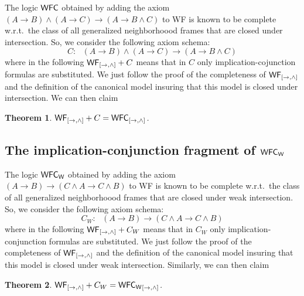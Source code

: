 \documentclass[12pt]{article}
\newtheorem{thm}{Theorem}[section]
\newtheorem{lem}[thm]{Lemma}
\begin{document}
The logic ${\sf WFC} $ obtained by adding the axiom $(A \rightarrow  B)\wedge (  A\rightarrow C ) \rightarrow (A\rightarrow B\wedge C) $ to {\sf WF} is known to be complete w.r.t.\ the class of all generalized neighborhoood frames that are closed under intersection. 
So, we consider the following axiom schema:
$$  C:~~ ~(A \rightarrow  B)\wedge (  A\rightarrow C ) \rightarrow (A\rightarrow B\wedge C) $$
where in the following ${\sf WF}_{[\rightarrow, \wedge]}+ C$ means that in $  C$ only implication-cojunction formulas are substituted.
We just follow the proof of the completeness of $ {\sf WF_{[\rightarrow, \wedge]}} $ and the definition of the canonical model insuring that this model is closed under intersection. We can then claim

\begin{thm}
${\sf WF}_{[\rightarrow, \wedge]}+ C={\sf WFC}_{[\rightarrow, \wedge]}$.
\end{thm}

\subsection{The implication-conjunction fragment of $ {\sf WFC_{W}}$}
The logic ${\sf WFC_{W}} $ obtained by adding the axiom $(A \rightarrow  B)\rightarrow (C\wedge A\rightarrow C\wedge B)   $ to {\sf WF} is known to be complete w.r.t.\ the class of all generalized neighborhoood frames that are closed under weak intersection. 
So, we consider the following axiom schema:
$$  C_{W}:~~ ~(A \rightarrow  B)\rightarrow (C\wedge A\rightarrow C\wedge B)  $$
where in the following ${\sf WF}_{[\rightarrow, \wedge]}+ C_{W}$ means that in $  C_{W}$ only implication-conjunction formulas are substituted.
We just follow the proof of the completeness of $ {\sf WF_{[\rightarrow, \wedge]}} $ and the definition of the canonical model  insuring that this model is closed under weak intersection. Similarly,  we can then claim


\begin{thm}
${\sf WF}_{[\rightarrow, \wedge]}+ C_{W}={\sf WFC_{W}}_{[\rightarrow, \wedge]}$.
\end{thm}
\end{document}
